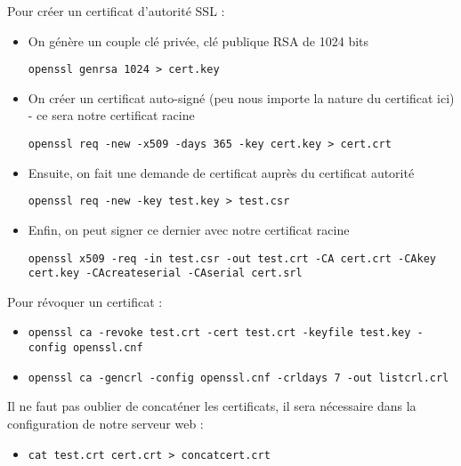 Pour créer un certificat d'autorité SSL :
\begin{itemize}
\item On génère un couple clé privée, clé publique RSA de 1024 bits\\
\begin{verbatim}
openssl genrsa 1024 > cert.key
\end{verbatim}
\item On créer un certificat auto-signé (peu nous importe la nature du certificat ici) - ce sera notre certificat racine\\
\begin{verbatim}
openssl req -new -x509 -days 365 -key cert.key > cert.crt
\end{verbatim}
\item Ensuite, on fait une demande de certificat auprès du certificat autorité\\
\begin{verbatim}
openssl req -new -key test.key > test.csr
\end{verbatim}
\item Enfin, on peut signer ce dernier avec notre certificat racine\\
\begin{verbatim}
openssl x509 -req -in test.csr -out test.crt -CA cert.crt -CAkey cert.key -CAcreateserial -CAserial cert.srl
\end{verbatim}
\end{itemize}

Pour révoquer un certificat :
\begin{itemize}
\item 
\begin{verbatim}
openssl ca -revoke test.crt -cert test.crt -keyfile test.key -config openssl.cnf
\end{verbatim}
\item 
\begin{verbatim}
openssl ca -gencrl -config openssl.cnf -crldays 7 -out listcrl.crl
\end{verbatim}
\end{itemize}

Il ne faut pas oublier de concaténer les certificats, il sera nécessaire dans la configuration de notre serveur web :
\begin{itemize}
\item 
\begin{verbatim}
cat test.crt cert.crt > concatcert.crt
\end{verbatim}
\end{itemize}

